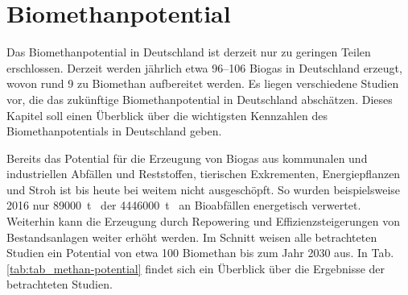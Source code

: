 \section{Biomethanpotential}

Das Biomethanpotential in Deutschland ist derzeit nur zu geringen Teilen erschlossen. Derzeit werden jährlich etwa \SIrange{96}{106}{\twhHs} Biogas in Deutschland erzeugt, wovon rund \SI{9}{\twhHs} zu Biomethan aufbereitet werden. Es liegen verschiedene Studien vor, die das zukünftige Biomethanpotential in Deutschland abschätzen. Dieses Kapitel soll einen Überblick über die wichtigsten Kennzahlen des Biomethanpotentials in Deutschland geben. \smallskip

Bereits das Potential für die Erzeugung von Biogas aus kommunalen und industriellen Abfällen und Reststoffen, tierischen Exkrementen, Energiepflanzen und Stroh ist bis heute bei weitem nicht ausgeschöpft. So wurden beispielsweise \SI{2016}{\relax} nur \SI{89000}{\tonne\peranno} der \SI{4446000}{\tonne\peranno} an Bioabfällen energetisch verwertet. Weiterhin kann die Erzeugung durch Repowering und Effizienzsteigerungen von Bestandsanlagen weiter erhöht werden. Im Schnitt weisen alle betrachteten Studien ein Potential von etwa \SI{100}{\twhHs} Biomethan bis zum Jahr 2030 aus. In Tab. \ref{tab:tab_methan-potential} findet sich ein Überblick über die Ergebnisse der betrachteten Studien.



